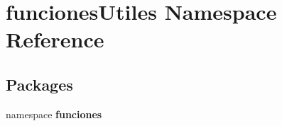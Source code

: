 \section{funciones\-Utiles \-Namespace \-Reference}
\label{namespacefunciones_utiles}
\subsection*{\-Packages}
\begin{DoxyCompactItemize}
\item 
namespace {\bf funciones}
\end{DoxyCompactItemize}
